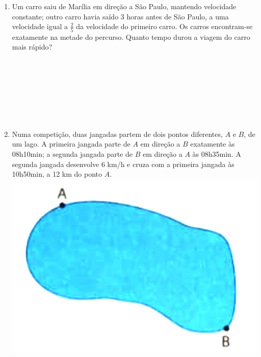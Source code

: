 \documentclass[a4paper,14pt]{article}
\begin{document}
\begin{multicols}{2}
\begin{enumerate}
    	    \item Um carro saiu de Marília em direção a São Paulo, mantendo velocidade constante; outro carro havia saído 3 horas antes de São Paulo, a uma velocidade igual a $\frac{2}{5}$ da velocidade do primeiro carro. Os carros encontram-se exatamente na metade do percurso. Quanto tempo durou a viagem do carro mais rápido? \\\\\\\\\\\\\\\\
    	    \item Numa competição, duas jangadas partem de dois pontos diferentes, $A$ e $B$, de um lago. A primeira jangada parte de $A$ em direção a $B$ exatamente às 08h10min; a segunda jangada parte de $B$ em direção a $A$ às 08h35min. A segunda jangada desenvolve 6 km/h e cruza com a primeira jangada às 10h50min, a 12 km do ponto $A$.
    	    \includegraphics[width=1\linewidth]{8FMA37_imagens/imagem1}
    	    

\end{enumerate}
\end{multicols}
\end{document}
